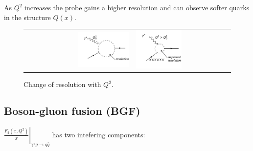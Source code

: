 As $Q^2$ increases the probe gains a higher resolution and can observe softer quarks in the structure $Q(x)$.

\begin{figure}[!htb]
  \begin{center}
    \begin{tabular}{rl}
      \includegraphics[width=0.5\textwidth]{images/web_feynman/image_74.png} &
      \includegraphics[width=0.5\textwidth]{images/web_feynman/image_75.png}
    \end{tabular}
    \caption[Change of resolution with $Q^2$]{Change of resolution with $Q^2$.}
    \label{fig:ch14_resolution}
  \end{center}
\end{figure}

\subsection{Boson-gluon fusion (BGF)}

$\left.\frac{F_2(x,Q^2)}{x}\right|_{\gamma^{\star}g \to q\bar{q}}$ has two intefering components:

